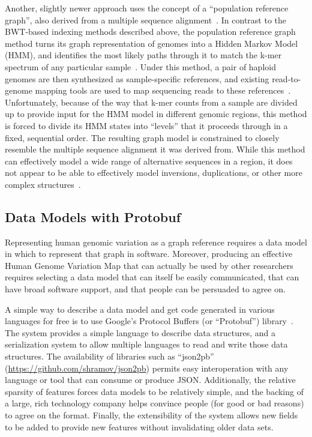 Another, slightly newer approach uses the concept of a ``population reference graph'', also derived from a multiple sequence alignment~\cite{dilthey2015improved}. In contrast to the BWT-based indexing methods described above, the population reference graph method turns its graph representation of genomes into a Hidden Markov Model (HMM), and identifies the most likely paths through it to match the k-mer spectrum of any particular sample~\cite{dilthey2015improved}. Under this method, a pair of haploid genomes are then synthesized as sample-specific references, and existing read-to-genome mapping tools are used to map sequencing reads to these references~\cite{dilthey2015improved}. Unfortunately, because of the way that k-mer counts from a sample are divided up to provide input for the HMM model in different genomic regions, this method is forced to divide its HMM states into ``levels'' that it proceeds through in a fixed, sequential order. The resulting graph model is constrained to closely resemble the multiple sequence alignment it was derived from. While this method can effectively model a wide range of alternative sequences in a region, it does not appear to be able to effectively model inversions, duplications, or other more complex structures~\cite{dilthey2015improved}.



\subsection{Data Models with Protobuf}

Representing human genomic variation as a graph reference requires a data model in which to represent that graph in software. Moreover, producing an effective Human Genome Variation Map that can actually be used by other researchers requires selecting a data model that can itself be easily communicated, that can have broad software support, and that people can be persuaded to agree on.

A simple way to describe a data model and get code generated in various languages for free is to use Google's Protocol Buffers (or ``Protobuf'') library~\cite{varda2008protocol}. The system provides a simple language to describe data structures, and a serialization system to allow multiple languages to read and write those data structures. The availability of libraries such as ``json2pb'' (\url{https://github.com/shramov/json2pb}) permits easy interoperation with any language or tool that can consume or produce JSON. Additionally, the relative sparsity of features forces data models to be relatively simple, and the backing of a large, rich technology company helps convince people (for good or bad reasons) to agree on the format. Finally, the extensibility of the system allows new fields to be added to provide new features without invalidating older data sets.

